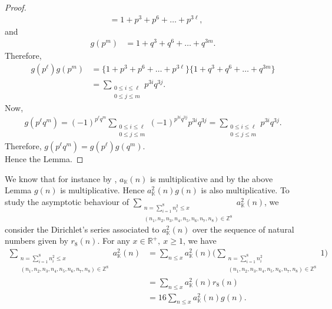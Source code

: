 \documentclass[preprint,12pt]{elsarticle}
\numberwithin{equation}{section}
\begin{document}
\begin{proof}
\begin{align*}
		&=1+p^{3}+p^{6}+\dots+p^{3\ell},
	\end{align*}
	and 
	\begin{align*}
		g(p^{m})&=1+q^{3}+q^{6}+\dots+q^{3m}.
	\end{align*}
	Therefore,
	\begin{align*}
		g(p^{\ell})g(p^{m})&=\{1+p^{3}+p^{6}+\dots+p^{3\ell}\}\{1+q^{3}+q^{6}+\dots+q^{3m}\}\\
		&=\sum\limits_{\substack{0\leq i\leq \ell \\ 0\leq j \leq m}} p^{3i}q^{3j}.
	\end{align*}
	Now, 
	\begin{align*}
		g(p^{\ell}q^{m})=(-1)^{p^{\ell}q^{m}}\sum\limits_{\substack{0\leq i\leq \ell \\ 0\leq j \leq m}}(-1)^{p^{3i}q^{3j}} p^{3i}q^{3j}=\sum\limits_{\substack{0\leq i\leq \ell \\ 0\leq j \leq m}} p^{3i}q^{3j}.
	\end{align*}
	Therefore,
	$g(p^{\ell}q^{m})=g(p^{\ell})g(q^{m})$.\\
	Hence the Lemma.
\end{proof}


We know that for instance by \cite{OM} , $a_{\mathbb{K}}(n)$ is multiplicative and by the above Lemma $g(n)$ is multiplicative. Hence $a_{\mathbb{K}}^{2}(n)g(n)$ is also multiplicative. To study the asymptotic behaviour of $\sum\limits_{\substack{ n= \sum_{i=1}^{8}n_{i}^{2}\leq x\\ (n_{1},n_{2},n_{3},n_{4},n_{5},n_{6},n_{7},n_{8})\in \mathbb{Z}^{8}  }}a_{\mathbb{K}}^{2}(n)$, we consider the Dirichlet's series associated to $a_{\mathbb{K}}^{2}(n)$ over the sequence of natural numbers given by $r_{8}(n)$. For any $x\in \mathbb{R^{+}},~x\geq 1$, we have
\begin{align*}
	\sum\limits_{\substack{n= \sum_{i=1}^{8}n_{i}^{2}\leq x\\ (n_{1},n_{2},n_{3},n_{4},n_{5},n_{6},n_{7},n_{8})\in \mathbb{Z}^{8}  }}a_{\mathbb{K}}^{2}(n) &=\sum_{n\leq x}a_{\mathbb{K}}^{2}(n)\Big(\sum\limits_{\substack{n= \sum_{i=1}^{8}n_{i}^{2}\\ (n_{1},n_{2},n_{3},n_{4},n_{5},n_{6},n_{7},n_{8})\in \mathbb{Z}^{8}}} 1\Big)\\
	&= \sum_{n\leq x} a_{\mathbb{K}}^{2}(n) r_{8}(n)\\
	&=16\sum_{n\leq x} a_{\mathbb{K}}^{2}(n) g(n).
\end{align*}
\end{document}

